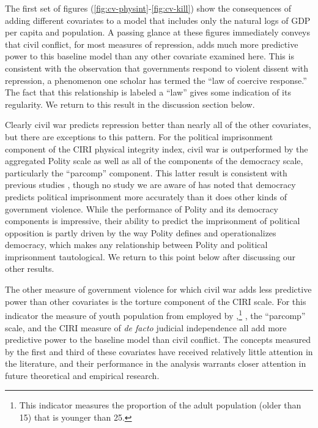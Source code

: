 \documentclass[12pt]{article}
\begin{document}
The first set of figures (\ref{fig:cv-physint}-\ref{fig:cv-kill}) show the consequences of adding different covariates to a model that includes only the natural logs of GDP per capita and population. A passing glance at these figures immediately conveys that civil conflict, for most measures of repression, adds much more predictive power to this baseline model than any other covariate examined here. This is consistent with the observation that governments respond to violent dissent with repression, a phenomenon one scholar \citep{Davenport2007AR} has termed the ``law of coercive response.'' The fact that this relationship is labeled a ``law'' gives some indication of its regularity. We return to this result in the discussion section below. 

Clearly civil war predicts repression better than nearly all of the other covariates, but there are exceptions to this pattern. For the political imprisonment component of the CIRI physical integrity index, civil war is outperformed by the aggregated Polity scale as well as all of the components of the democracy scale, particularly the ``parcomp'' component. This latter result is consistent with previous studies \citep{Keith2002PRQ,BDMetal2005}, though no study we are aware of has noted that democracy predicts political imprisonment more accurately than it does other kinds of government violence. While the performance of Polity and its democracy components is impressive, their ability to predict the imprisonment of political opposition is partly driven by the way Polity defines and operationalizes democracy, which makes any relationship between Polity and political imprisonment tautological. We return to this point below after discussing our other results.

The other measure of government violence for which civil war adds less predictive power than other covariates is the torture component of the CIRI scale. For this indicator the measure of youth population from \citet{Urdal2006} employed by \citet{NordaasDavenport2013},\footnote{This indicator measures the proportion of the adult population (older than 15) that is younger than 25.} , the ``parcomp'' scale, and the CIRI measure of {\it de facto} judicial independence all add more predictive power to the baseline model than civil conflict. The concepts measured by the first and third of these covariates have received relatively little attention in the literature, and their performance in the analysis warrants closer attention in future theoretical and empirical research. 
 
\end{document}

